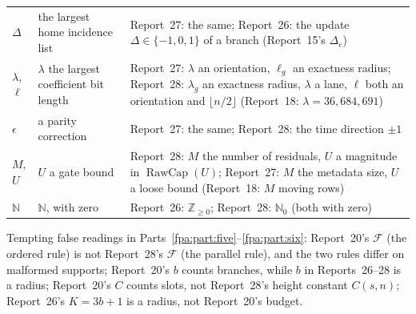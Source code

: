 \documentclass[11pt,a4paper]{article}
\numberwithin{equation}{section}
\begin{document}
\begin{center}
\begin{longtable}{@{}p{}p{}p{}@{}}
$\Delta$ & the largest home incidence list & Report~27: the same; Report~26: the update $\Delta\in\{-1,0,1\}$ of a branch (Report~15's $\Delta_e$)\\
$\lambda$, $\ell$ & $\lambda$ the largest coefficient bit length & Report~27: $\lambda$ an orientation, $\ell_g$ an exactness radius; Report~28: $\lambda_g$ an exactness radius, $\lambda$ a lane, $\ell$ both an orientation and $\lfloor n/2\rfloor$ (Report~18: $\lambda=36{,}684{,}691$)\\
$\epsilon$ & a parity correction & Report~27: the same; Report~28: the time direction $\pm1$\\
$M$, $U$ & $U$ a gate bound & Report~28: $M$ the number of residuals, $U$ a magnitude in $\operatorname{RawCap}(U)$; Report~27: $M$ the metadata size, $U$ a loose bound (Report~18: $M$ moving rows)\\
$\mathbb N$ & $\mathbb N$, with zero & Report~26: $\mathbb Z_{\ge0}$; Report~28: $\mathbb N_0$ (both with zero)\\
\bottomrule
\end{longtable}
\end{center}
Tempting false readings in Parts~\ref{fpa:part:five}--\ref{fpa:part:six}: Report~20's $\mathcal F$ (the ordered rule) is not Report~28's $\mathcal F$ (the parallel rule), and the two rules differ on malformed supports; Report~20's $b$ counts branches, while $b$ in Reports~26--28 is a radius; Report~20's $C$ counts slots, not Report~28's height constant $C(s,n)$; Report~26's $K=3b+1$ is a radius, not Report~20's budget.
\end{document}
